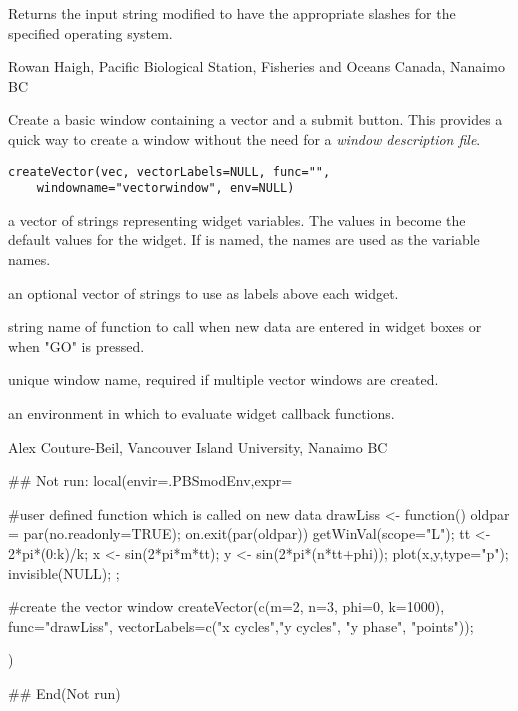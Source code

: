 \documentclass[letterpaper]{book}
\begin{document}
%
\begin{Value}
Returns the input string modified to have the appropriate slashes for the 
specified operating system.
\end{Value}
%
\begin{Author}\relax
Rowan Haigh, Pacific Biological Station, Fisheries and Oceans Canada, Nanaimo BC
\end{Author}
%
\begin{Description}\relax
Create a basic window containing a vector and a submit button. 
This provides a quick way to create a window without the need 
for a \emph{window description file}.
\end{Description}
%
\begin{Usage}
\begin{verbatim}
createVector(vec, vectorLabels=NULL, func="", 
    windowname="vectorwindow", env=NULL)
\end{verbatim}
\end{Usage}
%
\begin{Arguments}
\begin{ldescription}
\item[\code{vec}] a vector of strings representing widget variables. 
The values in  become the default values for the widget.
If  is named, the names are used as the variable names. 
\item[\code{vectorLabels}] an optional vector of strings to use as labels above each widget.
\item[\code{func}] string name of function to call when new data are entered 
in widget boxes or when "GO" is pressed.
\item[\code{windowname}] unique window name, required if multiple vector windows are created.
\item[\code{env}] an environment in which to evaluate widget callback functions.
\end{ldescription}
\end{Arguments}
%
\begin{Author}\relax
Alex Couture-Beil, Vancouver Island University, Nanaimo BC
\end{Author}
%
\begin{SeeAlso}\relax
{}
\end{SeeAlso}
%
\begin{Examples}
\begin{ExampleCode}
## Not run: 
local(envir=.PBSmodEnv,expr={
#user defined function which is called on new data  
drawLiss <- function() {
  oldpar = par(no.readonly=TRUE); on.exit(par(oldpar))
  getWinVal(scope="L");
  tt <- 2*pi*(0:k)/k; x <- sin(2*pi*m*tt); y <- sin(2*pi*(n*tt+phi));
  plot(x,y,type="p"); invisible(NULL); };

#create the vector window
createVector(c(m=2, n=3, phi=0, k=1000), func="drawLiss",
  vectorLabels=c("x cycles","y cycles", "y phase", "points"));
})

## End(Not run)
\end{ExampleCode}
\end{Examples}
\end{document}
